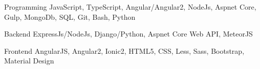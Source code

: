 


\begin{cvskills}


\cvskill
{Programming} %
{JavaScript, TypeScript, Angular/Angular2, NodeJs, Aspnet Core, Gulp, MongoDb, SQL, Git, Bash, Python} %


\cvskill
{Backend} %
{ExpressJs/NodeJs, Django/Python, Aspnet Core Web API, MeteorJS} %


\cvskill
{Frontend} %
{AngularJS, Angular2, Ionic2, HTML5, CSS, Less, Sass, Bootstrap, Material Design} %


\end{cvskills}
